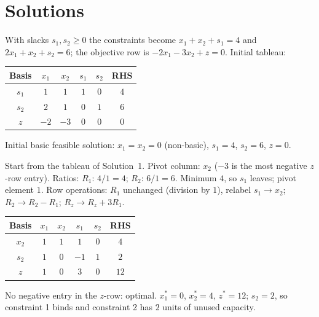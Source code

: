 \section{Solutions}

\begin{solutions}
  \item With slacks $s_1,s_2\ge 0$ the constraints become
        $x_1+x_2+s_1=4$ and $2x_1+x_2+s_2=6$; the objective row is
        $-2x_1-3x_2+z=0$. Initial tableau:
        \begin{center}
        \begin{tabular}{c|cccc|c}
        Basis & $x_1$ & $x_2$ & $s_1$ & $s_2$ & RHS\\
        \hline
        $s_1$ & $1$ & $1$ & $1$ & $0$ & $4$\\
        $s_2$ & $2$ & $1$ & $0$ & $1$ & $6$\\
        \hline
        $z$ & $-2$ & $-3$ & $0$ & $0$ & $0$\\
        \end{tabular}
        \end{center}
        Initial basic feasible solution: $x_1=x_2=0$ (non-basic),
        $s_1=4$, $s_2=6$, $z=0$.

  \item Start from the tableau of Solution~1. Pivot column: $x_2$
        ($-3$ is the most negative $z$-row entry). Ratios: $R_1$:
        $4/1=4$; $R_2$: $6/1=6$. Minimum $4$, so $s_1$ leaves; pivot
        element $1$. Row operations: $R_1$ unchanged (division by $1$),
        relabel $s_1\to x_2$; $R_2\to R_2-R_1$; $R_z\to R_z+3R_1$.
        \begin{center}
        \begin{tabular}{c|cccc|c}
        Basis & $x_1$ & $x_2$ & $s_1$ & $s_2$ & RHS\\
        \hline
        $x_2$ & $1$ & $1$ & $1$ & $0$ & $4$\\
        $s_2$ & $1$ & $0$ & $-1$ & $1$ & $2$\\
        \hline
        $z$ & $1$ & $0$ & $3$ & $0$ & $12$\\
        \end{tabular}
        \end{center}
        No negative entry in the $z$-row: optimal. $x_1^{*}=0$,
        $x_2^{*}=4$, $z^{*}=12$; $s_2=2$, so constraint 1 binds and
        constraint 2 has $2$ units of unused capacity.


\end{solutions}
